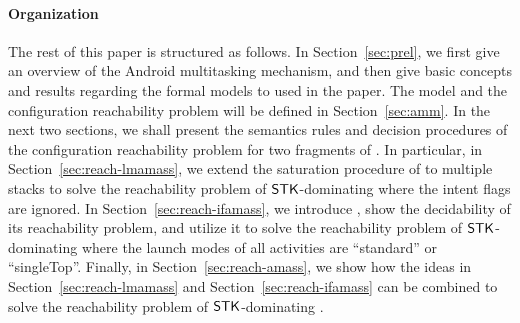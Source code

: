 
\paragraph{Organization} The rest of this paper is structured as follows. In Section~\ref{sec:prel}, 
we first give an overview of the Android multitasking mechanism, and then give %
basic concepts and results regarding the formal models to used in the paper.  %
The {\AMASS} model and the configuration reachability problem will be defined in Section~\ref{sec:amm}.  %
In the next two sections, we shall present the semantics rules and decision procedures of the configuration reachability problem
for two fragments of %
{\AMASS}. In particular, in Section~\ref{sec:reach-lmamass}, we extend the saturation procedure of {\PDS} to multiple stacks to solve the reachability problem of $\mathsf{STK}$-dominating {\AMASS} where the intent flags are ignored. 
In Section~\ref{sec:reach-ifamass}, we introduce {\WOTrPDS}, show the decidability of its reachability problem, and utilize it to solve the reachability problem of $\mathsf{STK}$-dominating {\AMASS} where the launch modes of all activities are ``standard'' or ``singleTop''. Finally, in Section~\ref{sec:reach-amass}, we show how the ideas in Section~\ref{sec:reach-lmamass} and Section~\ref{sec:reach-ifamass} can be combined to solve the reachability problem of $\mathsf{STK}$-dominating {\AMASS}. 

